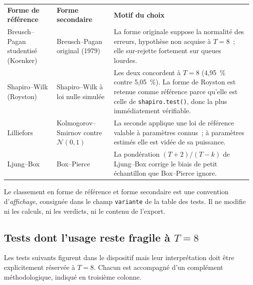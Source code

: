\documentclass[a4paper,11pt]{article}
\newcommand{\code}[1]{\texttt{\small #1}}
\begin{document}
\begin{center}
\small
{}
\begin{tabular}{@{}p{3.6cm}p{3.6cm}p{7.6cm}@{}}
\rowcolor{tableheader}
\textcolor{financeblue}{\textbf{Forme de référence}} &
\textcolor{financeblue}{\textbf{Forme secondaire}} &
\textcolor{financeblue}{\textbf{Motif du choix}} \\
Breusch--Pagan studentisé (Koenker) & Breusch--Pagan original (1979) &
La forme originale suppose la normalité des erreurs, hypothèse non acquise
à $T = 8$~; elle sur-rejette fortement sur queues lourdes. \\
Shapiro--Wilk (Royston) & Shapiro--Wilk à loi nulle simulée &
Les deux concordent à $T = 8$ (4,95~\% contre 5,05~\%). La forme de Royston est
retenue comme référence parce qu'elle est celle de \code{shapiro.test()}, donc
la plus immédiatement vérifiable. \\
Lilliefors & Kolmogorov--Smirnov contre $\mathcal{N}(0,1)$ &
La seconde applique une loi de référence valable à paramètres connus~; à
paramètres estimés elle est vidée de sa puissance. \\
Ljung--Box & Box--Pierce &
La pondération $(T+2)/(T-k)$ de Ljung--Box corrige le biais de petit
échantillon que Box--Pierce ignore. \\
\end{tabular}
\end{center}

\noindent
Le classement en forme de référence et forme secondaire est une convention
d'\emph{affichage}, consignée dans le champ \code{variante} de la table des
tests. Il ne modifie ni les calculs, ni les verdicts, ni le contenu de l'export.

\subsection{Tests dont l'usage reste fragile à $T = 8$}

Les tests suivants figurent dans le dispositif mais leur interprétation doit
être explicitement réservée à $T = 8$. Chacun est accompagné d'un complément
méthodologique, indiqué en troisième colonne.
\end{document}
